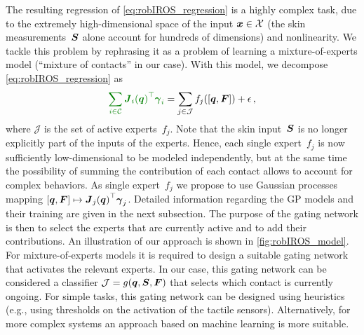 	The resulting regression of \eq\eqref{eq:robIROS_regression} is a highly complex task, due to the extremely high-dimensional space of the input $\boldsymbol x \in \mathcal{X}$ (the skin measurements~$\mathcal{\boldsymbol{S}}$ alone account for hundreds of dimensions) and nonlinearity.
    We tackle this problem by rephrasing it as a problem of learning a mixture-of-experts model (``mixture of contacts'' in our case).
	With this model, we decompose \eq\eqref{eq:robIROS_regression} as
	\begin{align}
		\textcolor{darkgreen}{\sum_{i \in\mathcal{C}} {\jacobian_i(\q)}\T \extForces_i}  = \sum_{j\in\mathcal{J}} f_j([\q, \ftsForces]) + \epsilon\,,
		\label{eq:robIROS_expertofmixtureregression}
	\end{align}
	where $\mathcal{J}$ is the set of active experts~$f_j$.
	Note that the skin input~$\mathcal{\boldsymbol{S}}$ is no longer explicitly part of the inputs of the experts. 
    Hence, each single expert~$f_j$ is now sufficiently low-dimensional to be modeled independently, but at the same time the possibility of summing the contribution of each contact allows to account for complex behaviors.
    As single expert~$f_j$ we propose to use Gaussian processes mapping $[\boldsymbol q, \boldsymbol{F}] \mapsto {\boldsymbol J_j(\boldsymbol q)}^\top \boldsymbol{\gamma}_j$.
    Detailed information regarding the GP models and their training are given in the next subsection.
    The purpose of the gating network is then to select the experts that are currently active and to add their contributions.    
    An illustration of our approach is shown in \fig\ref{fig:robIROS_model}.
	For mixture-of-experts models it is required to design a suitable gating network that activates the relevant experts.
    In our case, this gating network can be considered a classifier $\mathcal{J} = g(\boldsymbol q, \mathcal{\boldsymbol{S}},\boldsymbol{F})$ that selects which contact is currently ongoing.
	For simple tasks, this gating network can be designed using heuristics (e.g., using thresholds on the activation of the tactile sensors). 
    Alternatively, for more complex systems an approach based on machine learning is more suitable. 



